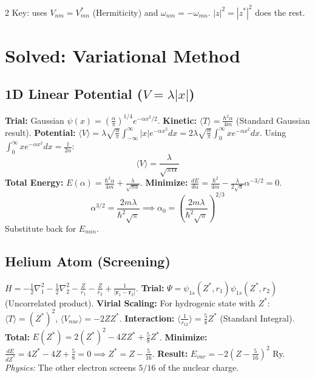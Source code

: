 \documentclass[9pt,a4paper]{article} %
\begin{document}
\begin{multicols}{2}
Key: uses $V_{nm}=V_{mn}^*$ (Hermiticity) and $\omega_{nm}=-\omega_{mn}$.
$|z|^2=|z^*|^2$ does the rest.

\section{ Solved: Variational Method}

\subsection{ 1D Linear Potential ($V = \lambda |x|$)}
\textbf{Trial:} Gaussian $\psi(x) = (\frac{\alpha}{\pi})^{1/4} e^{-\alpha x^2/2}$.
\textbf{Kinetic:} $\langle T \rangle = \frac{\hbar^2 \alpha}{4m}$ (Standard Gaussian result).
\textbf{Potential:} $\langle V \rangle = \lambda \sqrt{\frac{\alpha}{\pi}} \int_{-\infty}^\infty |x| e^{-\alpha x^2} dx = 2\lambda \sqrt{\frac{\alpha}{\pi}} \int_0^\infty x e^{-\alpha x^2} dx$.
Using $\int_0^\infty x e^{-\alpha x^2} dx = \frac{1}{2\alpha}$:
\[ \langle V \rangle = \frac{\lambda}{\sqrt{\pi \alpha}} \]
\textbf{Total Energy:} $E(\alpha) = \frac{\hbar^2 \alpha}{4m} + \frac{\lambda}{\sqrt{\pi \alpha}}$.
\textbf{Minimize:} $\frac{dE}{d\alpha} = \frac{\hbar^2}{4m} - \frac{\lambda}{2\sqrt{\pi}}\alpha^{-3/2} = 0$.
\[ \alpha^{3/2} = \frac{2m\lambda}{\hbar^2\sqrt{\pi}} \implies \alpha_0 = \left( \frac{2m\lambda}{\hbar^2\sqrt{\pi}} \right)^{2/3} \]
Substitute back for $E_{min}$.

\subsection{Helium Atom (Screening)}
$H = -\frac{1}{2}\nabla_1^2 - \frac{1}{2}\nabla_2^2 - \frac{Z}{r_1} - \frac{Z}{r_2} + \frac{1}{|\mathbf{r}_1 - \mathbf{r}_2|}$.
\textbf{Trial:} $\Psi = \psi_{1s}(Z^*, r_1)\psi_{1s}(Z^*, r_2)$ (Uncorrelated product).
\textbf{Virial Scaling:} For hydrogenic state with $Z^*$:
$\langle T \rangle = (Z^*)^2$, $\langle V_{nuc} \rangle = -2Z Z^*$.
\textbf{Interaction:} $\langle \frac{1}{r_{12}} \rangle = \frac{5}{8}Z^*$ (Standard Integral).
\textbf{Total:} $E(Z^*) = 2(Z^*)^2 - 4Z Z^* + \frac{5}{8}Z^*$.
\textbf{Minimize:} $\frac{dE}{dZ^*} = 4Z^* - 4Z + \frac{5}{8} = 0 \implies Z^* = Z - \frac{5}{16}$.
\textbf{Result:} $E_{var} = -2(Z - \frac{5}{16})^2$ Ry.
\textit{Physics:} The other electron screens $5/16$ of the nuclear charge.


\end{multicols}
\end{document}
